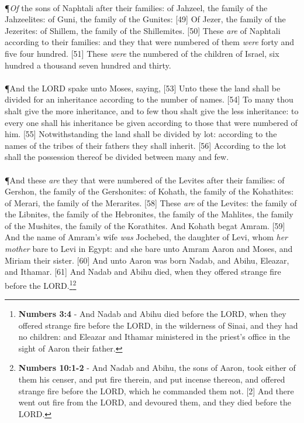 \\
\P \textcolor[cmyk]{0.99998,1,0,0}{\emph{Of} the sons of Naphtali after their families: of Jahzeel, the family of the Jahzeelites: of Guni, the family of the Gunites:}
[49] \textcolor[cmyk]{0.99998,1,0,0}{Of Jezer, the family of the Jezerites: of Shillem, the family of the Shillemites.}
[50] \textcolor[cmyk]{0.99998,1,0,0}{These \emph{are}  of Naphtali according to their families: and they that were numbered of them \emph{were} forty and five  four hundred.}
[51] \textcolor[cmyk]{0.99998,1,0,0}{These \emph{were} the numbered of the children of Israel, six hundred  a thousand seven hundred and thirty.}\\
\\
\P \textcolor[cmyk]{0.99998,1,0,0}{And the LORD spake unto Moses, saying,}
[53] \textcolor[cmyk]{0.99998,1,0,0}{Unto these the land shall be divided for an inheritance according to the number of names.}
[54] \textcolor[cmyk]{0.99998,1,0,0}{To many thou shalt give the more inheritance, and to few thou shalt give the less inheritance: to every one shall his inheritance be given according to those that were numbered of him.}
[55] \textcolor[cmyk]{0.99998,1,0,0}{Notwithstanding the land shall be divided by lot: according to the names of the tribes of their fathers they shall inherit.}
[56] \textcolor[cmyk]{0.99998,1,0,0}{According to the lot shall the possession thereof be divided between many and few.}\\
\\
\P \textcolor[cmyk]{0.99998,1,0,0}{And these \emph{are} they that were numbered of the Levites after their families: of Gershon, the family of the Gershonites: of Kohath, the family of the Kohathites: of Merari, the family of the Merarites.}
[58] \textcolor[cmyk]{0.99998,1,0,0}{These \emph{are}  of the Levites: the family of the Libnites, the family of the Hebronites, the family of the Mahlites, the family of the Mushites, the family of the Korathites. And Kohath begat Amram.}
[59] \textcolor[cmyk]{0.99998,1,0,0}{And the name of Amram's wife \emph{was} Jochebed, the daughter of Levi, whom \emph{her} \emph{mother} bare to Levi in Egypt: and she bare unto Amram Aaron and Moses, and Miriam their sister.}
[60] \textcolor[cmyk]{0.99998,1,0,0}{And unto Aaron was born Nadab, and Abihu, Eleazar, and Ithamar.}
[61] \textcolor[cmyk]{0.99998,1,0,0}{And Nadab and Abihu died, when they offered strange fire before the LORD.}\footnote{\textbf{Numbers 3:4} - And Nadab and Abihu died before the LORD, when they offered strange fire before the LORD, in the wilderness of Sinai, and they had no children: and Eleazar and Ithamar ministered in the priest’s office in the sight of Aaron their father.}\footnote{\textbf{Numbers 10:1-2} - And Nadab and Abihu, the sons of Aaron, took either of them his censer, and put fire therein, and put incense thereon, and offered strange fire before the LORD, which he commanded them not. [2] And there went out fire from the LORD, and devoured them, and they died before the LORD.}
